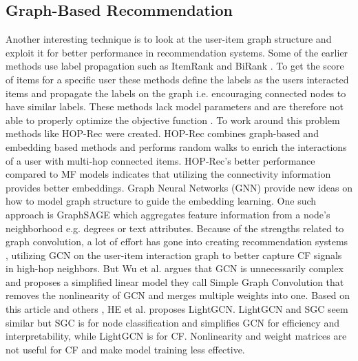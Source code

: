 \subsection{Graph-Based Recommendation}
Another interesting technique is to look at the user-item graph structure and exploit it for better performance in recommendation systems.
Some of the earlier methods use label propagation such as ItemRank \cite{ItemRank} and BiRank \cite{BiRank}.
To get the score of items for a specific user these methods define the labels as the users interacted items and propagate the labels on the graph i.e. encouraging connected nodes to have similar labels.
These methods lack model parameters and are therefore not able to properly optimize the objective function \cite{NGCF_2019}.
To work around this problem methods like HOP-Rec \cite{HOP_Rec} were created.
HOP-Rec combines graph-based and embedding based methods and performs random walks to enrich the interactions of a user with multi-hop connected items.
HOP-Rec's better performance compared to MF models indicates that utilizing the connectivity information provides better embeddings.
Graph Neural Networks (GNN) provide new ideas on how to model graph structure to guide the embedding learning.
One such approach is GraphSAGE \cite{IND_REP_LEA} which aggregates feature information from a node's neighborhood e.g. degrees or text attributes.
Because of the strengths related to graph convolution, a lot of effort has gone into creating recommendation systems \cite{NGCF_2019,GC_MC,Priceaware}, utilizing GCN on the user-item interaction graph to better capture CF signals in high-hop neighbors.
But Wu et al. \cite{SGCN} argues that GCN is unnecessarily complex and proposes a simplified linear model they call Simple Graph Convolution that removes the nonlinearity of GCN and merges multiple weights into one.
Based on this article and others \cite{PRE_PROP,DEEP_GCN}, HE et al. \cite{lightgcn} proposes LightGCN.
LightGCN and SGC seem similar but SGC is for node classification and simplifies GCN for efficiency and interpretability, while LightGCN is for CF.
Nonlinearity and weight matrices are not useful for CF and make model training less effective.
